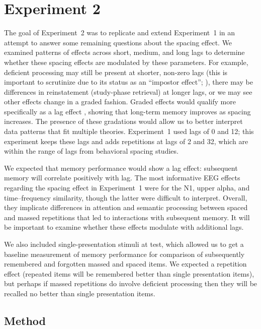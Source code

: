 
\chapter{Experiment 2}

The goal of Experiment~2 was to replicate and extend Experiment~1 in an attempt to answer some remaining questions about the spacing effect.  We examined patterns of effects across short, medium, and long lags to determine whether these spacing effects are modulated by these parameters.  For example, deficient processing may still be present at shorter, non-zero lags (this is important to scrutinize due to its status as an ``impostor effect''; ), there may be differences in reinstatement (study-phase retrieval) at longer lags, or we may see other effects change in a graded fashion.  Graded effects would qualify more specifically as a lag effect \cite{Gree1989a,KahaHowa2005}, showing that long-term memory improves as spacing increases.
The presence of these gradations would allow us to better interpret data patterns that fit multiple theories.  Experiment~1 used lags of 0 and 12; this experiment keeps these lags and adds repetitions at lags of 2 and 32, which are within the range of lags from behavioral spacing studies.

We expected that memory performance would show a lag effect: subsequent memory will correlate positively with lag.  The most informative EEG effects regarding the spacing effect in Experiment~1 were for the N1, upper alpha, and time--frequency similarity, though the latter were difficult to interpret.  Overall, they implicate differences in attention and semantic processing between spaced and massed repetitions that led to interactions with subsequent memory.  It will be important to examine whether these effects modulate with additional lags.

We also included single-presentation stimuli at test, which allowed us to get a baseline measurement of memory performance for comparison of subsequently remembered and forgotten massed and spaced items.  We expected a repetition effect (repeated items will be remembered better than single presentation items), but perhaps if massed repetitions do involve deficient processing then they will be recalled no better than single presentation items.

\section{Method}

